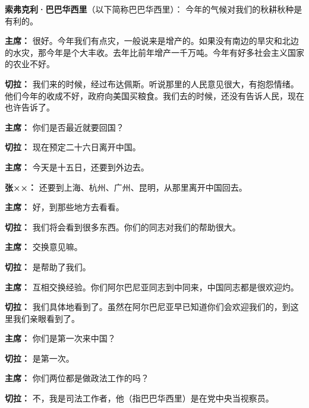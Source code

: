 \begin{duihua}
\item[\textbf{索弗克利·巴巴华西里}（以下简称巴巴华西里）：] 今年的气候对我们的秋耕秋种是有利的。

\item[\textbf{主席：}] 很好。今年我们有点灾，一般说来是增产的。如果没有南边的旱灾和北边的水灾，那今年是个大丰收。去年比前年增产一千万吨。今年有好多社会主义国家的农业不好。

\item[\textbf{切拉：}] 我们来的时候，经过布达佩斯。听说那里的人民意见很大，有抱怨情绪。他们今年的收成不好，政府向美国买粮食。我们去的时候，还没有告诉人民，现在也许告诉了。

\item[\textbf{主席：}] 你们是否最近就要回国？

\item[\textbf{切拉：}] 现在预定二十六日离开中国。

\item[\textbf{主席：}] 今天是十五日，还要到外边去。

\item[\textbf{张××：}] 还要到上海、杭州、广州、昆明，从那里离开中国回去。

\item[\textbf{主席：}] 好，到那些地方去看看。

\item[\textbf{切拉：}] 我们将会看到很多东西。你们的同志对我们的帮助很大。

\item[\textbf{主席：}] 交换意见嘛。

\item[\textbf{切拉：}] 是帮助了我们。

\item[\textbf{主席：}] 互相交换经验。你们阿尔巴尼亚同志到中同来，中国同志都是很欢迎灼。

\item[\textbf{切拉：}] 我们具体地看到了。虽然在阿尔巴尼亚早已知道你们会欢迎我们的，到这里我们亲眼看到了。

\item[\textbf{主席：}] 你们是第一次来中国？

\item[\textbf{切拉：}] 是第一次。

\item[\textbf{主席：}] 你们两位都是做政法工作的吗？

\item[\textbf{切拉：}] 不，我是司法工作者，他（指巴巴华西里）是在党中央当视察员。


\end{duihua}
